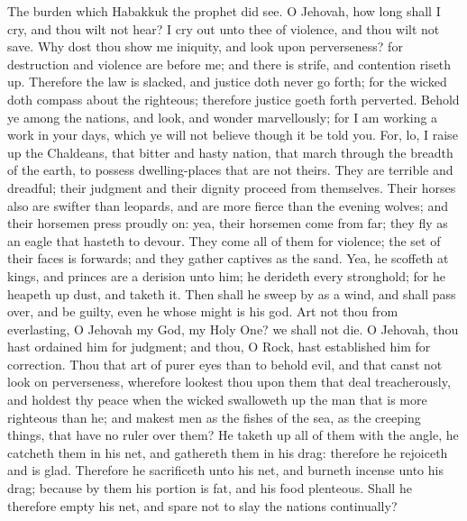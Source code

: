


The burden which Habakkuk the prophet did see.  O Jehovah, how long shall I cry, and thou wilt not hear? I cry out unto thee of violence, and thou wilt not save. Why dost thou show me iniquity, and look upon perverseness? for destruction and violence are before me; and there is strife, and contention riseth up. Therefore the law is slacked, and justice doth never go forth; for the wicked doth compass about the righteous; therefore justice goeth forth perverted.  Behold ye among the nations, and look, and wonder marvellously; for I am working a work in your days, which ye will not believe though it be told you. For, lo, I raise up the Chaldeans, that bitter and hasty nation, that march through the breadth of the earth, to possess dwelling-places that are not theirs. They are terrible and dreadful; their judgment and their dignity proceed from themselves. Their horses also are swifter than leopards, and are more fierce than the evening wolves; and their horsemen press proudly on: yea, their horsemen come from far; they fly as an eagle that hasteth to devour. They come all of them for violence; the set of their faces is forwards; and they gather captives as the sand. Yea, he scoffeth at kings, and princes are a derision unto him; he derideth every stronghold; for he heapeth up dust, and taketh it. Then shall he sweep by as a wind, and shall pass over, and be guilty, even he whose might is his god.  Art not thou from everlasting, O Jehovah my God, my Holy One? we shall not die. O Jehovah, thou hast ordained him for judgment; and thou, O Rock, hast established him for correction. Thou that art of purer eyes than to behold evil, and that canst not look on perverseness, wherefore lookest thou upon them that deal treacherously, and holdest thy peace when the wicked swalloweth up the man that is more righteous than he; and makest men as the fishes of the sea, as the creeping things, that have no ruler over them? He taketh up all of them with the angle, he catcheth them in his net, and gathereth them in his drag: therefore he rejoiceth and is glad. Therefore he sacrificeth unto his net, and burneth incense unto his drag; because by them his portion is fat, and his food plenteous. Shall he therefore empty his net, and spare not to slay the nations continually? 

